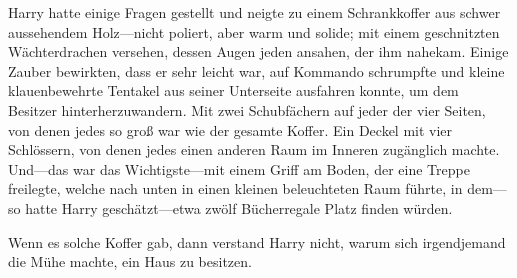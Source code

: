 Harry hatte einige Fragen gestellt und neigte zu einem Schrankkoffer aus schwer aussehendem Holz—nicht poliert, aber warm und solide; mit einem geschnitzten Wächterdrachen versehen, dessen Augen jeden ansahen, der ihm nahekam. Einige Zauber bewirkten, dass er sehr leicht war, auf Kommando schrumpfte und kleine klauenbewehrte Tentakel aus seiner Unterseite ausfahren konnte, um dem Besitzer hinterherzuwandern. Mit zwei Schubfächern auf jeder der vier Seiten, von denen jedes so groß war wie der gesamte Koffer. Ein Deckel mit vier Schlössern, von denen jedes einen anderen Raum im Inneren zugänglich machte. Und—das war das Wichtigste—mit einem Griff am Boden, der eine Treppe freilegte, welche nach unten in einen kleinen beleuchteten Raum führte, in dem—so hatte Harry geschätzt—etwa zwölf Bücherregale Platz finden würden.

Wenn es solche Koffer gab, dann verstand Harry nicht, warum sich irgendjemand die Mühe machte, ein Haus zu besitzen.

